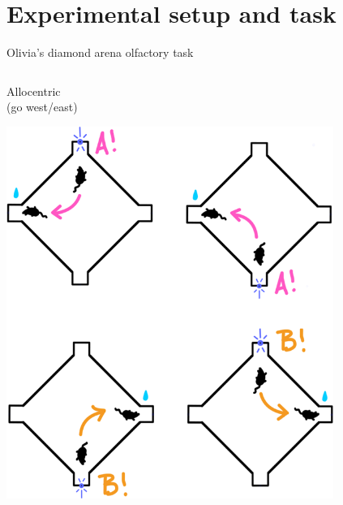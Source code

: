 \documentclass[bigger]{beamer}
\begin{document}
\section{Experimental setup and task}
\label{sec:orgf95b7e8}
\begin{frame}[label={sec:orgbbaad3c}]{Olivia's diamond arena olfactory task}
\begin{columns}
\begin{column}[t]{0.5\columnwidth}
\center
Allocentric\\
(go west/east)
\begin{center}
\includegraphics[width=0.8\textwidth]{img/allocentric-task.png}
\end{center}
\end{column}


\end{columns}
\end{frame}
\end{document}
